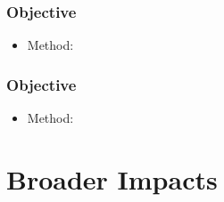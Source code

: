\documentclass[12pt, oneside]{article}
\begin{document}
\subsubsection{Objective}
\begin{itemize}
 \item Method:
\end{itemize}

\subsubsection{Objective}
\begin{itemize}
 \item Method:
\end{itemize}


\section{Broader Impacts}



\end{document}
